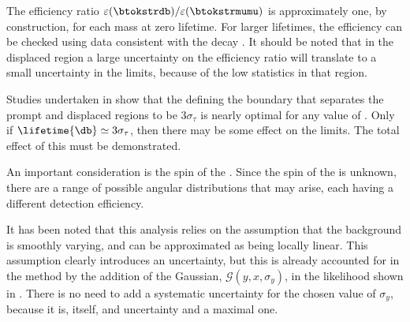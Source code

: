 The efficiency ratio $\varepsilon(\btokstrdb)/\varepsilon(\btokstrmumu)$ is approximately one, by
construction, for each mass at zero lifetime.
For larger lifetimes, the efficiency can be checked using data consistent with the decay
\decay{\Bd}{\jpsi\KS}.
It should be noted that in the displaced region a large uncertainty on the efficiency ratio will
translate to a small uncertainty in the limits, because of the low statistics in that region.



Studies undertaken in  show that the defining the boundary that separates
the prompt and displaced regions to be $3\sigma_\tau$ is nearly optimal for any value of
\lifetime{\db}.
Only if $\lifetime{\db}\simeq3\sigma_\tau$, then there may be some effect on the limits.
The total effect of this must be demonstrated.

An important consideration is the spin of the \db.
Since the spin of the \db is unknown, there are a range of possible angular distributions that may
arise, each having a different detection efficiency.
%

It has been noted that this analysis relies on the assumption that the background is smoothly
varying, and can be approximated as being locally linear.
This assumption clearly introduces an uncertainty, but this is already accounted for in the method
by the addition of the Gaussian, $\mathcal{G}(y, x, \sigma_y)$, in the likelihood shown in
.
There is no need to add a systematic uncertainty for the chosen value of $\sigma_y$, because it is,
itself, and uncertainty and a maximal one.











